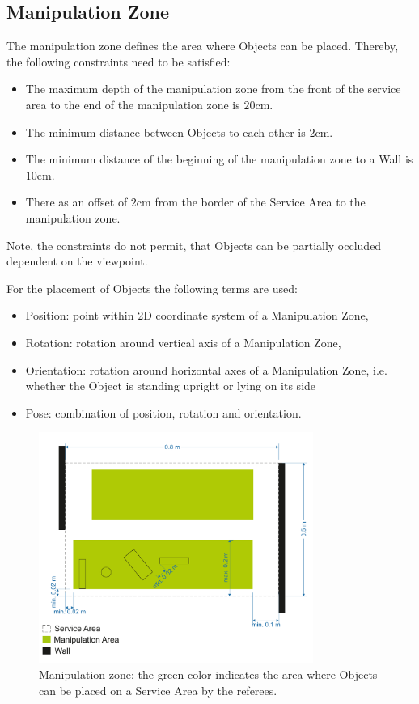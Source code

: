 \subsection{Manipulation Zone} \label{ssec:ManipulationZone}
The manipulation zone defines the area where Objects can be placed. Thereby, the following constraints need to be satisfied:
\begin{itemize}
	\item The maximum depth of the manipulation zone from the front of the service area to the end of the manipulation zone is $20\si{\centi\meter}$.
	\item The minimum distance between Objects to each other is $2\si{\centi\meter}$.
	\item The minimum distance of the beginning of the manipulation zone to a Wall is $10\si{\centi\meter}$.
	\item There as an offset of $2\si{\centi\meter}$ from the border of the Service Area to the manipulation zone.
\end{itemize}
Note, the constraints do not permit, that Objects can be partially occluded dependent on the viewpoint.

For the placement of Objects the following terms are used:

\begin{itemize}
	\item Position: point within 2D coordinate system of a Manipulation Zone,
	\item Rotation: rotation around vertical axis of a Manipulation Zone,
	\item Orientation: rotation around horizontal axes of a Manipulation Zone, i.e. whether the Object is standing upright or lying on its side
	\item Pose: combination of position, rotation and orientation.
\end{itemize}
\begin{figure} [h!]
	\centering
	\includegraphics[width=0.8\textwidth ]{./images/manipulation_zone2023.pdf}
	\caption{Manipulation zone: the green color indicates the area where Objects can be placed on a Service Area by the referees.}
	\label{fig:manipulation_zone}
\end{figure}









